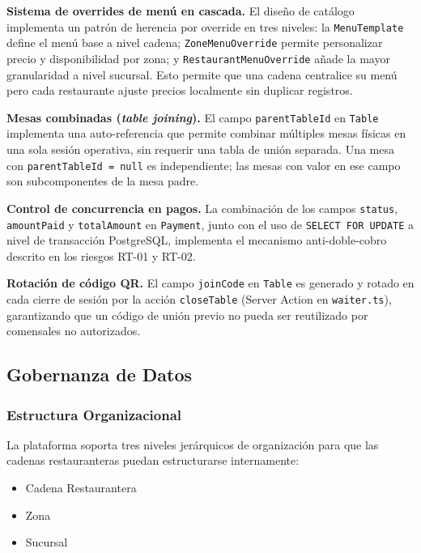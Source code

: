 \noindent\textbf{Sistema de overrides de men\'u en cascada.}
El dise\~no de cat\'alogo implementa un patr\'on de herencia por override en tres
niveles: la \texttt{MenuTemplate} define el men\'u base a nivel cadena;
\texttt{ZoneMenuOverride} permite personalizar precio y disponibilidad por zona;
y \texttt{RestaurantMenuOverride} a\~nade la mayor granularidad a nivel sucursal.
Esto permite que una cadena centralice su men\'u pero cada restaurante ajuste
precios localmente sin duplicar registros.

\noindent\textbf{Mesas combinadas (\textit{table joining}).}
El campo \texttt{parentTableId} en \texttt{Table} implementa una auto-referencia
que permite combinar m\'ultiples mesas f\'isicas en una sola sesi\'on operativa,
sin requerir una tabla de uni\'on separada. Una mesa con \texttt{parentTableId = null}
es independiente; las mesas con valor en ese campo son subcomponentes de la mesa padre.

\noindent\textbf{Control de concurrencia en pagos.}
La combinaci\'on de los campos \texttt{status}, \texttt{amountPaid} y
\texttt{totalAmount} en \texttt{Payment}, junto con el uso de
\texttt{SELECT FOR UPDATE} a nivel de transacci\'on PostgreSQL, implementa el
mecanismo anti-doble-cobro descrito en los riesgos RT-01 y RT-02.

\noindent\textbf{Rotaci\'on de c\'odigo QR.}
El campo \texttt{joinCode} en \texttt{Table} es generado y rotado en cada cierre
de sesi\'on por la acci\'on \texttt{closeTable} (Server Action en
\texttt{waiter.ts}), garantizando que un c\'odigo de uni\'on previo no pueda
ser reutilizado por comensales no autorizados.

\FloatBarrier

\subsection{Gobernanza de Datos}

\subsubsection{Estructura Organizacional}

La plataforma soporta tres niveles jerárquicos de organización para que las cadenas
restauranteras puedan estructurarse internamente:

\begin{itemize}[leftmargin=1.5em]
  \item Cadena Restaurantera
  \item Zona
  \item Sucursal
\end{itemize}


